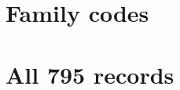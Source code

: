 \documentclass[11pt]{article}
\begin{document}



\appendix
\section{Family codes}\label{app:families}


\section{All 795 records}\label{app:all}

\end{document}
